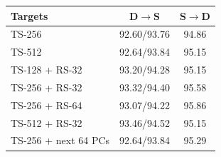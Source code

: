 \par\medskip\noindent\begin{minipage}{\columnwidth}
\captionsetup{type=table}
\centering
\caption{Subspace dimensions on University-1652. D$\rightarrow$S reports R@1/AP (\%). S$\rightarrow$D reports R@1 (\%).}
\label{tab:supp-dimensions}
{\footnotesize\setlength{\tabcolsep}{2pt}\renewcommand{\arraystretch}{1.08}
\begin{tabular*}{\columnwidth}{@{\extracolsep{\fill}}lcc@{}}
\toprule
Targets & D$\rightarrow$S & S$\rightarrow$D \\
\midrule
TS-256 & 92.60/93.76 & 94.86 \\
TS-512 & 92.64/93.84 & 95.15 \\
TS-128 + RS-32 & 93.20/94.28 & 95.15 \\
TS-256 + RS-32 & 93.32/94.40 & 95.58 \\
TS-256 + RS-64 & 93.07/94.22 & 95.86 \\
TS-512 + RS-32 & 93.46/94.52 & 95.15 \\
TS-256 + next 64 PCs & 92.64/93.84 & 95.29 \\
\bottomrule
\end{tabular*}}
\end{minipage}\par\medskip
\par\medskip\noindent\begin{minipage}{\columnwidth}
\captionsetup{type=table}
\centering
\caption{Subspace dimensions on target datasets. Cells report D$\rightarrow$S R@1/AP (\%).}
\label{tab:supp-dimensions-transfer}
{\footnotesize\setlength{\tabcolsep}{2pt}\renewcommand{\arraystretch}{1.08}
}
\end{minipage}\par\medskip

